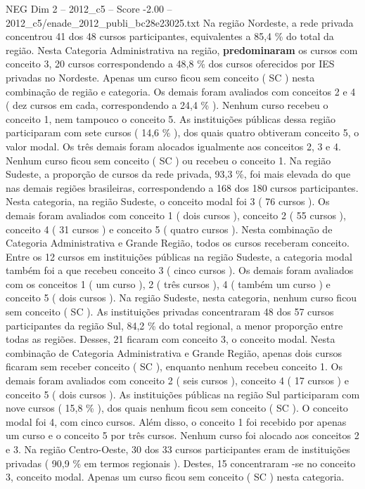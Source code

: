 \begin{textsample}{NEG Dim 2 – 2012\_c5 – Score -2.00 – 2012\_c5/enade\_2012\_publi\_bc28e23025.txt}
Na região Nordeste, a rede privada concentrou 41 dos 48 cursos participantes, equivalentes a 85,4 \% do total da região.
Nesta Categoria Administrativa na região, \textbf{predominaram} os cursos com conceito 3, 20 cursos correspondendo a 48,8 \% dos cursos oferecidos por IES privadas no Nordeste.
Apenas um curso ficou sem conceito ( SC ) nesta combinação de região e categoria.
Os demais foram avaliados com conceitos 2 e 4 ( dez cursos em cada, correspondendo a 24,4 \% ).
Nenhum curso recebeu o conceito 1, nem tampouco o conceito 5.
As instituições públicas dessa região participaram com sete cursos ( 14,6 \% ), dos quais quatro obtiveram conceito 5, o valor modal.
Os três demais foram alocados igualmente aos conceitos 2, 3 e 4.
Nenhum curso ficou sem conceito ( SC ) ou recebeu o conceito 1.
Na região Sudeste, a proporção de cursos da rede privada, 93,3 \%, foi mais elevada do que nas demais regiões brasileiras, correspondendo a 168 dos 180 cursos participantes.
Nesta categoria, na região Sudeste, o conceito modal foi 3 ( 76 cursos ).
Os demais foram avaliados com conceito 1 ( dois cursos ), conceito 2 ( 55 cursos ), conceito 4 ( 31 cursos ) e conceito 5 ( quatro cursos ).
Nesta combinação de Categoria Administrativa e Grande Região, todos os cursos receberam conceito.
Entre os 12 cursos em instituições públicas na região Sudeste, a categoria modal também foi a que recebeu conceito 3 ( cinco cursos ).
Os demais foram avaliados com os conceitos 1 ( um curso ), 2 ( três cursos ), 4 ( também um curso ) e conceito 5 ( dois cursos ).
Na região Sudeste, nesta categoria, nenhum curso ficou sem conceito ( SC ).
As instituições privadas concentraram 48 dos 57 cursos participantes da região Sul, 84,2 \% do total regional, a menor proporção entre todas as regiões.
Desses, 21 ficaram com conceito 3, o conceito modal.
Nesta combinação de Categoria Administrativa e Grande Região, apenas dois cursos ficaram sem receber conceito ( SC ), enquanto nenhum recebeu conceito 1.
Os demais foram avaliados com conceito 2 ( seis cursos ), conceito 4 ( 17 cursos ) e conceito 5 ( dois cursos ).
As instituições públicas na região Sul participaram com nove cursos ( 15,8 \% ), dos quais nenhum ficou sem conceito ( SC ).
O conceito modal foi 4, com cinco cursos.
Além disso, o conceito 1 foi recebido por apenas um curso e o conceito 5 por três cursos.
Nenhum curso foi alocado aos conceitos 2 e 3.
Na região Centro-Oeste, 30 dos 33 cursos participantes eram de instituições privadas ( 90,9 \% em termos regionais ).
Destes, 15 concentraram -se no conceito 3, conceito modal.
Apenas um curso ficou sem conceito ( SC ) nesta categoria.

\end{textsample}
